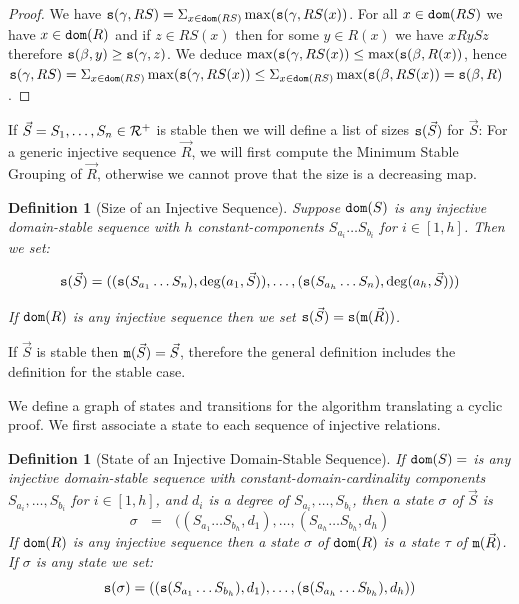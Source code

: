 \documentclass{lmcs}
\newtheorem{definition}[theorem]{Definition}
\begin{document}
\begin{proof}
We have ${\tt s}(\gamma, RS) =
\Sigma_{x \in {\tt dom}(RS)} \max({\tt s}(\gamma, RS(x))$. For all $x \in {\tt dom}(RS)$ we have
$x \in {\tt dom}(R)$ and if $z \in RS(x)$ then for some $y \in R(x)$ we have $x R y S z$
therefore ${\tt s}(\beta,y) \ge {\tt s}(\gamma,z)$. We deduce 
$\max({\tt s}(\gamma, RS(x)) \le \max({\tt s}(\beta, R(x))$, hence 
$
{\tt s}(\gamma, RS) =
\Sigma_{x \in {\tt dom}(RS)} \max({\tt s}(\gamma, RS(x)) \le
\Sigma_{x \in {\tt dom}(RS)} \max({\tt s}(\beta, RS(x)) =
{\tt s}(\beta, R)
$.
\end{proof}

If $\vec{S} = S_1, \ldots, S_n \in {\mathcal R}^+$ is stable then we will define a list of 
sizes ${\tt s}(\vec{S})$ for $\vec{S}$: 
For a generic injective sequence $\vec{R}$, we will first compute
the Minimum Stable Grouping of $\vec{R}$,
otherwise we cannot prove that the size is a decreasing map. 

\begin{definition}[Size of an Injective Sequence]
Suppose ${\tt dom}(S)$ is any injective domain-stable sequence with $h$ constant-components
$S_{a_i}\ldots S_{b_i}$ for $i \in [1,h]$. Then we set:

$$
{\tt s}(\vec{S}) 
= 
(
( {\tt s}(S_{a_1}\ldots S_n), \deg(a_1,\vec{S}) ), 
\ldots,
( {\tt s}(S_{a_h}\ldots S_n), \deg(a_h,\vec{S}) )
)
$$

If ${\tt dom}(R)$ is any injective sequence then we set 
${\tt s}(\vec{S}) = {\tt s}({\tt m}(\vec{R}))$.
\end{definition}

If $\vec{S}$ is stable then ${\tt m}(\vec{S}) = \vec{S}$, therefore 
the general definition includes the definition for the stable case.


We define a graph of states and transitions for the algorithm translating a cyclic proof. We first
associate a state to each sequence of injective relations.


\begin{definition}[State of an Injective Domain-Stable Sequence]
If ${\tt dom}(S) =$ is any injective domain-stable sequence with constant-domain-cardinality
components $S_{a_i},\ldots, S_{b_i}$ for $i \in [1,h]$, 
and $d_i$ is a degree of $S_{a_i},\ldots, S_{b_i}$, then a state $\sigma$ of $\vec{S}$ is
$$
\sigma \ \ \ 
= \ \ \ 
(
(S_{a_1}\ldots S_{b_h}, d_1), 
\ldots,
(S_{a_h}\ldots S_{b_h}, d_h)
$$
If ${\tt dom}(R)$ is any injective sequence then a state $\sigma$ of ${\tt dom}(R)$ is a state
$\tau$ of ${\tt m}(\vec{R})$. 
If $\sigma$ is any state we set:
$$
{\tt s}(\sigma)
=
(
({\tt s}(S_{a_1}\ldots S_{b_h}), d_1), 
\ldots,
({\tt s}(S_{a_h}\ldots S_{b_h}), d_h)
)
$$

\end{definition}
 
\end{document}
